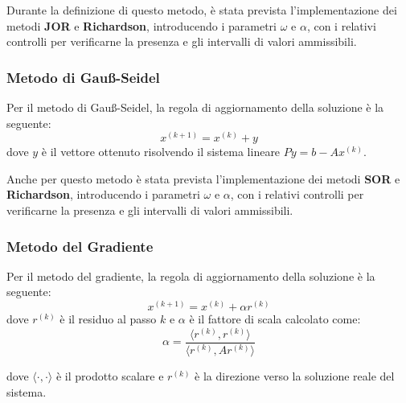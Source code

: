 Durante la definizione di questo metodo, è stata prevista l'implementazione dei
metodi \textbf{JOR} e \textbf{Richardson}, introducendo i parametri $\omega$ e
$\alpha$, con i relativi controlli per verificarne la presenza e gli intervalli
di valori ammissibili.
\subsubsection{Metodo di Gauß-Seidel}
Per il metodo di Gauß-Seidel, la regola di aggiornamento della soluzione è la seguente:
\begin{equation}
    x^{(k+1)} = x^{(k)} + y
\end{equation}
dove $y$ è il vettore ottenuto risolvendo il sistema lineare $Py = b - Ax^{(k)}$.

Anche per questo metodo è stata prevista l'implementazione dei metodi \textbf{SOR}
e \textbf{Richardson}, introducendo i parametri $\omega$ e $\alpha$, con i relativi
controlli per verificarne la presenza e gli intervalli di valori ammissibili.

\subsubsection{Metodo del Gradiente}
Per il metodo del gradiente, la regola di aggiornamento della soluzione è la seguente:
\begin{equation}
    x^{(k+1)} = x^{(k)} + \alpha r^{(k)}
\end{equation}
dove $r^{(k)}$ è il residuo al passo $k$ e $\alpha$ è il fattore di scala calcolato
come:
\begin{equation}
    \alpha = \frac{\langle r^{(k)}, r^{(k)}\rangle}{\langle r^{(k)}, Ar^{(k)}\rangle}
\end{equation}

dove $\langle \cdot, \cdot \rangle$ è il prodotto scalare e $r^{(k)}$ è la direzione 
verso la soluzione reale del sistema.

